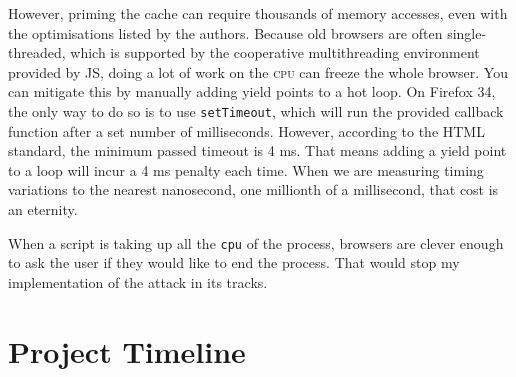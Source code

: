 \documentclass[a4paper,10pt,twocolumn]{article}
\theoremstyle{definition}
\newcommand*{\code}{\texttt}
\newcommand*{\acronym}{\textsc}
\begin{document}
However, priming the cache can require thousands of memory accesses, even with
the optimisations listed by the authors.
Because old browsers are often single-threaded, which is supported by the
cooperative multithreading environment provided by JS, doing a lot of work on
the \acronym{cpu} can freeze the whole browser.
You can mitigate this by manually adding yield points to a hot loop.
On Firefox 34, the only way to do so is to use \code{setTimeout}, which will run
the provided callback function after a set number of milliseconds.
However, according to the HTML standard, the minimum passed timeout is 4 ms.
That means adding a yield point to a loop will incur a 4 ms penalty each time.
When we are measuring timing variations to the nearest nanosecond, one millionth
of a millisecond, that cost is an eternity.

When a script is taking up all the \code{cpu} of the process, browsers are
clever enough to ask the user if they would like to end the process.
That would stop my implementation of the attack in its tracks.

\appendix
\section{Project Timeline}
\end{document}
